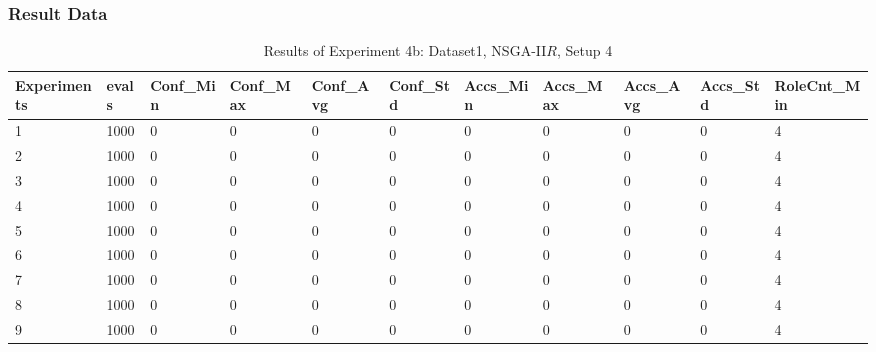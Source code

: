 		\subsubsection{Result Data}
		\label{sec:A_Exp4b_Data}
		\begin{table}[H]
			\caption{Results of Experiment 4b: Dataset1, NSGA-II$R$, Setup 4}
			\label{tab:A_Exp4b_Data}
			\begin{adjustbox}{max width=380pt,keepaspectratio,angle=90}
				\begin{tabular}{|l|l|l|l|l|l|l|l|l|l|l|}
					\hline
					\rowcolor[HTML]{EFEFEF} 
					Experiments & evals & Conf\_Min & Conf\_Max & Conf\_Avg & Conf\_Std & Accs\_Min & Accs\_Max & Accs\_Avg & Accs\_Std & RoleCnt\_Min \\ \hline
					\rowcolor[HTML]{FFFFFF} 
					1           & 1000  & 0         & 0         & 0         & 0         & 0         & 0         & 0         & 0         & 4            \\ \hline
					\rowcolor[HTML]{FFFFFF} 
					2           & 1000  & 0         & 0         & 0         & 0         & 0         & 0         & 0         & 0         & 4            \\ \hline
					\rowcolor[HTML]{FFFFFF} 
					3           & 1000  & 0         & 0         & 0         & 0         & 0         & 0         & 0         & 0         & 4            \\ \hline
					\rowcolor[HTML]{FFFFFF} 
					4           & 1000  & 0         & 0         & 0         & 0         & 0         & 0         & 0         & 0         & 4            \\ \hline
					\rowcolor[HTML]{FFFFFF} 
					5           & 1000  & 0         & 0         & 0         & 0         & 0         & 0         & 0         & 0         & 4            \\ \hline
					\rowcolor[HTML]{FFFFFF} 
					6           & 1000  & 0         & 0         & 0         & 0         & 0         & 0         & 0         & 0         & 4            \\ \hline
					\rowcolor[HTML]{FFFFFF} 
					7           & 1000  & 0         & 0         & 0         & 0         & 0         & 0         & 0         & 0         & 4            \\ \hline
					\rowcolor[HTML]{FFFFFF} 
					8           & 1000  & 0         & 0         & 0         & 0         & 0         & 0         & 0         & 0         & 4            \\ \hline
					\rowcolor[HTML]{FFFFFF} 
					9           & 1000  & 0         & 0         & 0         & 0         & 0         & 0         & 0         & 0         & 4            \\ \hline

\end{tabular}
\end{adjustbox}
\end{table}
